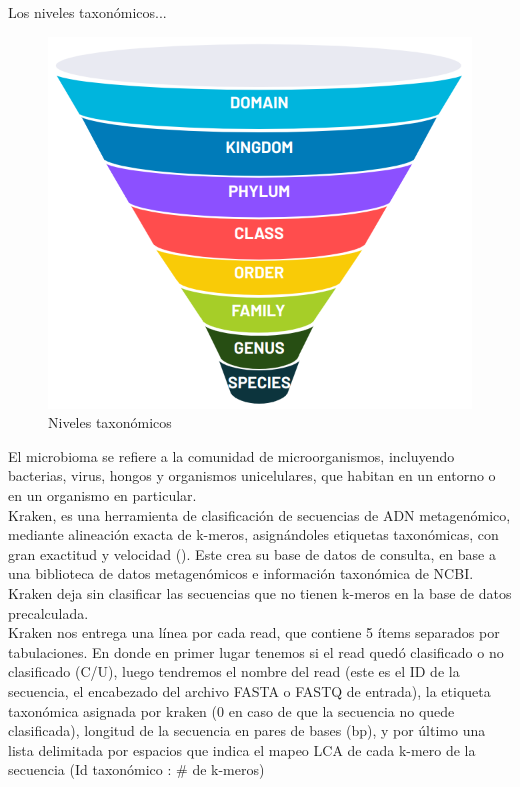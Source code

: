 Los niveles taxonómicos...\\

\begin{figure}[h]
\centering
\includegraphics[scale=0.3]{Img/cap1/taxonomic.png}
\caption{Niveles taxonómicos}
\end{figure}

El microbioma se refiere a la comunidad de microorganismos, incluyendo bacterias, virus, hongos y organismos unicelulares, que habitan en un entorno o en un organismo en particular.\\

Kraken, es una herramienta de clasificación de secuencias de ADN metagenómico, mediante alineación exacta de k-meros, asignándoles etiquetas taxonómicas, con gran exactitud y velocidad (\cite{wood2014kraken}).  Este crea su base de datos de consulta, en base a una biblioteca de datos metagenómicos e información taxonómica de NCBI. \\

Kraken deja sin clasificar las secuencias que no tienen k-meros en la base de datos precalculada. \\

Kraken nos entrega una línea por cada read, que contiene 5 ítems separados por tabulaciones. En donde en primer lugar tenemos si el read quedó clasificado o no clasificado (C/U), luego tendremos el nombre del read (este es el ID de la secuencia, el encabezado del archivo FASTA o FASTQ de entrada), la etiqueta taxonómica asignada por kraken (0 en caso de que la secuencia no quede clasificada), longitud de la secuencia en pares de bases (bp), y por último una lista delimitada por espacios que indica el mapeo LCA de cada k-mero de la secuencia (Id taxonómico : \# de k-meros) \\

